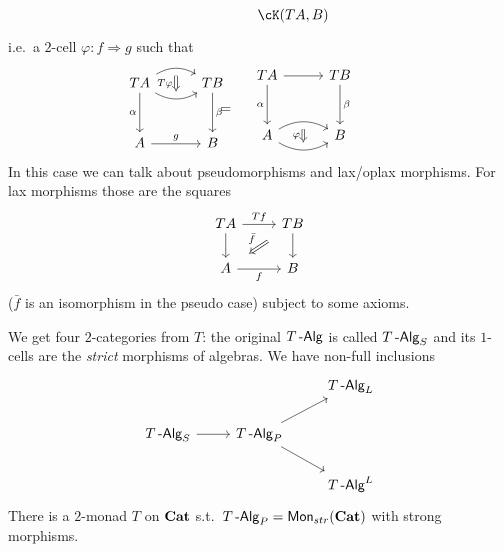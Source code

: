 \documentclass[a4paper,11pt,oneside,openany]{scrbook}
\begin{document}
\begin{exmp}
\begin{enumerate}
\[\begin{tikzcd}
                      && \cK(TA,B)
			      \end{tikzcd}
		      \]
		      i.e.\ a $2$-cell $\varphi\colon f\Rightarrow g$ such that
		      \[
			      \begin{minipage}{0.3\linewidth}
				      \begin{tikzcd}[row sep=1cm, column sep=1cm]
					      TA\arrow[d, "\alpha"'] \arrow[r, bend right, ""{name=D, anchor=center}] \arrow[r, bend left, ""{name=U, anchor=center}] & TB \arrow[d, "\beta"] \\
					      A\arrow[r, "g"]            &B
					      \ar[Rightarrow, shorten <= .3em, shorten >= .3em, "T\varphi"', from=U, to=D]
				      \end{tikzcd}
			      \end{minipage}
			      \hspace{-1.3cm}
			      =
			      \hspace{.4cm}
			      \begin{minipage}{0.3\linewidth}
				      \begin{tikzcd}[row sep=1cm, column sep=1cm]
					      TA\arrow[d, "\alpha"'] \arrow[r]                        &  TB\arrow[d, "\beta"] \\
					      A\arrow[r, bend right, ""{name=D, anchor=center}] \arrow[r, bend left, ""{name=U, anchor=center}] &      B
					      \ar[Rightarrow, shorten <= .3em, shorten >= .3em, "\varphi"', from=U, to=D]
				      \end{tikzcd}
			      \end{minipage}
		      \]
		      In this case we can talk about pseudomorphisms and lax/oplax morphisms. For lax morphisms those are the squares
		      \[
			      \begin{tikzcd}
				      TA\arrow[d]\arrow["Tf"]{r}
				      & TB\arrow[d] \arrow[dl, Rightarrow, shorten <= 1em, shorten >= 1em, "\bar{f}"']  \\
				      A\arrow["f"']{r}
				      & B
			      \end{tikzcd}
		      \]
		      ($\bar{f}$ is an isomorphism in the pseudo case) subject to some axioms.
	\end{enumerate}
\end{exmp}
We get four $2$-categories from $T$: the original $T\operatorname{-\mathsf{Alg}}$ is called $T\operatorname{-\mathsf{Alg}}_S$ and its $1$-cells are the \emph{strict} morphisms of algebras. We have non-full inclusions
\[
	\begin{tikzcd}
		&& T\Alg_L\\
		T\Alg_S \arrow[r]
		& T\Alg_P \arrow[ur]    \arrow[dr] \\
		&& T\Alg^L
	\end{tikzcd}
\]
There is a $2$-monad $T$ on ${\normalfont\textbf{Cat}}$ s.t.\ $T\operatorname{-\mathsf{Alg}}_P=\operatorname{\mathsf{Mon}}_{str}({\normalfont\textbf{Cat}})$ with strong morphisms.
\end{document}
